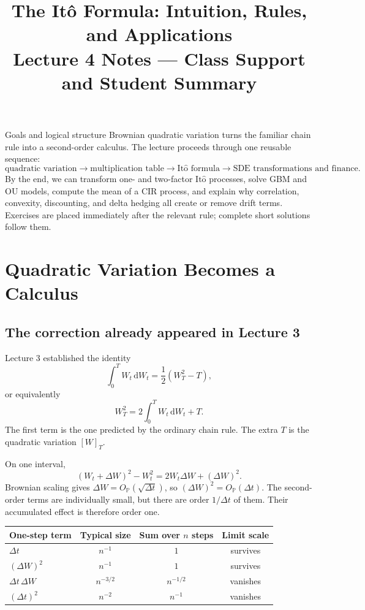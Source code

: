 \documentclass[10pt]{article}
\title{\textbf{The It\^o Formula: Intuition, Rules, and Applications}\\
\large Lecture 4 Notes --- Class Support and Student Summary}
\author{}
\date{}
\newcommand{\Pp}{\mathbb P}
\newcommand{\1}{\mathbf 1}
\newcommand{\dd}{\,\mathrm d}
\newcommand{\Ito}{\mathrm{It\hat{o}}}
\theoremstyle{definition}
\begin{document}
\maketitle
\vspace{-1.4em}

\begin{keyidea}{Goals and logical structure}
Brownian quadratic variation turns the familiar chain rule into a second-order
calculus. The lecture proceeds through one reusable sequence:
\[
\text{quadratic variation}
\longrightarrow
\text{multiplication table}
\longrightarrow
\text{\(\Ito\) formula}
\longrightarrow
\text{SDE transformations and finance}.
\]
By the end, we can transform one- and two-factor \(\Ito\) processes, solve GBM
and OU models, compute the mean of a CIR process, and explain why correlation,
convexity, discounting, and delta hedging all create or remove drift terms.
Exercises are placed immediately after the relevant rule; complete short
solutions follow them.
\end{keyidea}

\section{Quadratic Variation Becomes a Calculus}

\subsection{The correction already appeared in Lecture 3}

Lecture 3 established the identity
\[
\int_0^T W_t\dd W_t=\frac12(W_T^2-T),
\]
or equivalently
\[
W_T^2=2\int_0^T W_t\dd W_t+T.
\]
The first term is the one predicted by the ordinary chain rule. The extra
\(T\) is the quadratic variation \([W]_T\).

On one interval,
\[
(W_t+\Delta W)^2-W_t^2
=2W_t\Delta W+(\Delta W)^2.
\]
Brownian scaling gives \(\Delta W=O_{\Pp}(\sqrt{\Delta t})\), so
\((\Delta W)^2=O_{\Pp}(\Delta t)\). The second-order terms are individually
small, but there are order \(1/\Delta t\) of them. Their accumulated effect is
therefore order one.

\begin{center}
\begin{tabular}{lccc}
\toprule
One-step term & Typical size & Sum over \(n\) steps & Limit scale\\
\midrule
\(\Delta t\) & \(n^{-1}\) & \(1\) & survives\\
\((\Delta W)^2\) & \(n^{-1}\) & \(1\) & survives\\
\(\Delta t\,\Delta W\) & \(n^{-3/2}\) & \(n^{-1/2}\) & vanishes\\
\((\Delta t)^2\) & \(n^{-2}\) & \(n^{-1}\) & vanishes\\
\bottomrule
\end{tabular}
\end{center}
\end{document}
